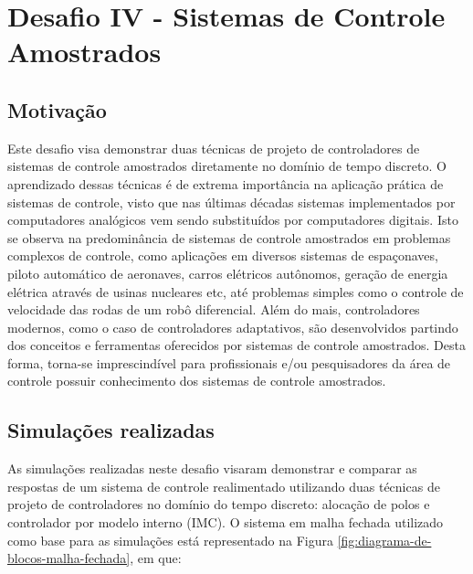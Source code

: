 \section{Desafio IV - Sistemas de Controle Amostrados} 

\subsection{Motivação}
Este desafio visa demonstrar duas técnicas de projeto de controladores de
sistemas de controle amostrados diretamente no domínio de tempo discreto. O
aprendizado dessas técnicas é de extrema importância na aplicação prática de
sistemas de controle, visto que nas últimas décadas sistemas implementados por
computadores analógicos vem sendo substituídos por computadores digitais. Isto
se observa na predominância de sistemas de controle amostrados em problemas
complexos de controle, como aplicações em diversos sistemas de espaçonaves,
piloto automático de aeronaves, carros elétricos autônomos, geração de energia
elétrica através de usinas nucleares etc, até problemas simples como o controle
de velocidade das rodas de um robô diferencial. Além do mais, controladores
modernos, como o caso de controladores adaptativos, são desenvolvidos partindo
dos conceitos e ferramentas oferecidos por sistemas de controle amostrados.
Desta forma, torna-se imprescindível para profissionais e/ou pesquisadores da
área de controle possuir conhecimento dos sistemas de controle amostrados.

\subsection{Simulações realizadas}
\label{sub:simulacoes-realizadas-desafio4}
As simulações realizadas neste desafio visaram demonstrar e comparar as
respostas de um sistema de controle realimentado utilizando duas técnicas de
projeto de controladores no domínio do tempo discreto: alocação de polos e
controlador por modelo interno (IMC). O sistema em malha fechada utilizado como
base para as simulações está representado na Figura
\ref{fig:diagrama-de-blocos-malha-fechada}, em que:

